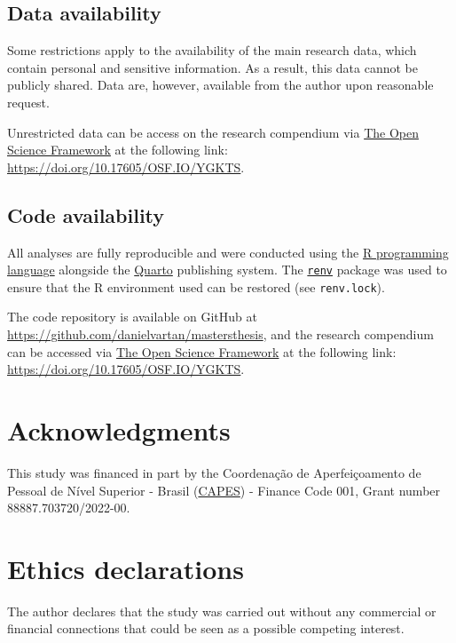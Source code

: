 \documentclass[
12pt,
openright,
oneside,
a4paper,
chapter=TITLE,
section=TITLE,
french,
spanish,
brazil,
english
]{abntex2}\usepackage{array}
\begin{document}
\subsection{Data availability}\label{data-availability}

Some restrictions apply to the availability of the main research data,
which contain personal and sensitive information. As a result, this data
cannot be publicly shared. Data are, however, available from the author
upon reasonable request.

Unrestricted data can be access on the research compendium via
\href{https://osf.io/}{The Open Science Framework} at the following
link: \url{https://doi.org/10.17605/OSF.IO/YGKTS}.

\subsection{Code availability}\label{code-availability}

All analyses are fully reproducible and were conducted using the
\href{https://www.r-project.org/}{R programming language} alongside the
\href{https://quarto.org/}{Quarto} publishing system. The
\href{https://rstudio.github.io/renv/}{\texttt{renv}} package was used
to ensure that the R environment used can be restored (see
\texttt{renv.lock}).

The code repository is available on GitHub at
\url{https://github.com/danielvartan/mastersthesis}, and the research
compendium can be accessed via \href{https://osf.io/}{The Open Science
Framework} at the following link:
\url{https://doi.org/10.17605/OSF.IO/YGKTS}.

\section{Acknowledgments}\label{acknowledgments}

This study was financed in part by the Coordenação de Aperfeiçoamento de
Pessoal de Nível Superior - Brasil
(\href{https://www.gov.br/capes/}{CAPES}) - Finance Code 001, Grant
number 88887.703720/2022-00.

\section{Ethics declarations}\label{ethics-declarations}

The author declares that the study was carried out without any
commercial or financial connections that could be seen as a possible
competing interest.
\end{document}
